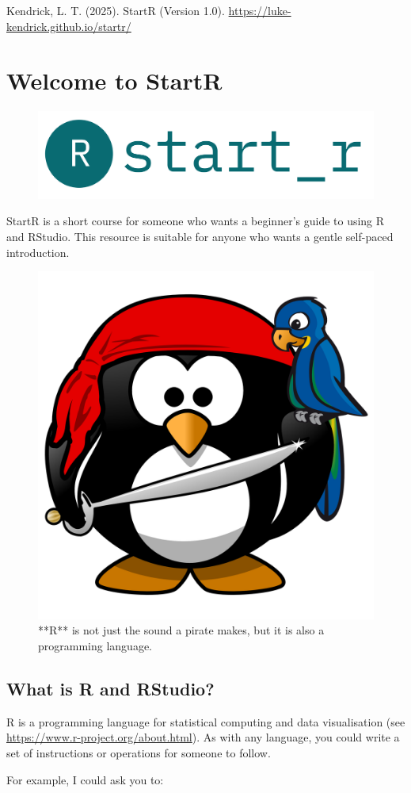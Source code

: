 \documentclass[
]{book}
\let\oldsection\section
\renewcommand{\section}{\needspace{5\baselineskip}\oldsection}
\begin{document}
Kendrick, L. T. (2025). StartR (Version 1.0). \url{https://luke-kendrick.github.io/startr/}

\chapter{Welcome to StartR}\label{welcome-to-startr}

\begin{figure}

{\centering \includegraphics[width=0.5\linewidth]{images/startr} 

}

\caption{ }\label{fig:fig}
\end{figure}

StartR is a short course for someone who wants a beginner's guide to using R and RStudio. This resource is suitable for anyone who wants a gentle self-paced introduction.

\begin{figure}

{\centering \includegraphics[width=0.25\linewidth]{images/pirate_spaced} 

}

\caption{**R** is not just the sound a pirate makes, but it is also a programming language.}\label{fig:fig1}
\end{figure}

\section{What is R and RStudio?}\label{what-is-r-and-rstudio}

R is a programming language for statistical computing and data visualisation (see \url{https://www.r-project.org/about.html}). As with any language, you could write a set of instructions or operations for someone to follow.

For example, I could ask you to:
\end{document}
